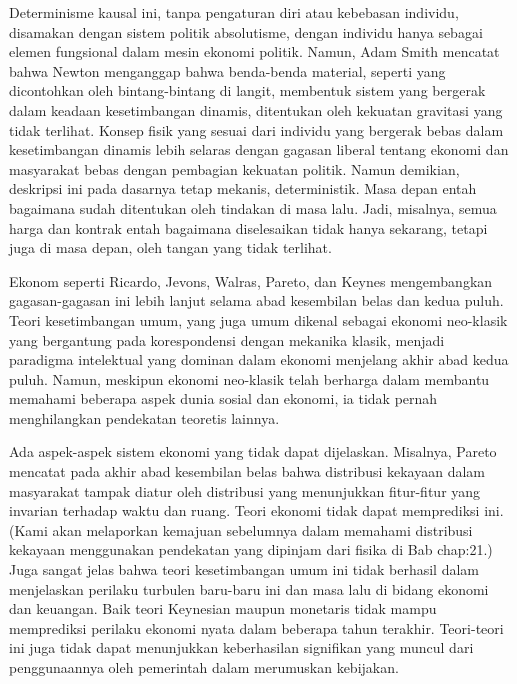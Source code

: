 \documentclass[a4paper,12pt]{book}
\begin{document}
Determinisme kausal ini, tanpa pengaturan diri atau kebebasan individu, disamakan dengan sistem politik absolutisme, dengan individu hanya sebagai elemen fungsional dalam mesin ekonomi politik. Namun, Adam Smith mencatat bahwa Newton menganggap bahwa benda-benda material, seperti yang dicontohkan oleh bintang-bintang di langit, membentuk sistem yang bergerak dalam keadaan kesetimbangan dinamis, ditentukan oleh kekuatan gravitasi yang tidak terlihat. Konsep fisik yang sesuai dari individu yang bergerak bebas dalam kesetimbangan dinamis lebih selaras dengan gagasan liberal tentang ekonomi dan masyarakat bebas dengan pembagian kekuatan politik. Namun demikian, deskripsi ini pada dasarnya tetap mekanis, deterministik. Masa depan entah bagaimana sudah ditentukan oleh tindakan di masa lalu. Jadi, misalnya, semua harga dan kontrak entah bagaimana diselesaikan tidak hanya sekarang, tetapi juga di masa depan, oleh tangan yang tidak terlihat.

Ekonom seperti Ricardo, Jevons, Walras, Pareto, dan Keynes mengembangkan gagasan-gagasan ini lebih lanjut selama abad kesembilan belas dan kedua puluh. Teori kesetimbangan umum, yang juga umum dikenal sebagai ekonomi neo-klasik yang bergantung pada korespondensi dengan mekanika klasik, menjadi paradigma intelektual yang dominan dalam ekonomi menjelang akhir abad kedua puluh. Namun, meskipun ekonomi neo-klasik telah berharga dalam membantu memahami beberapa aspek dunia sosial dan ekonomi, ia tidak pernah menghilangkan pendekatan teoretis lainnya.

Ada aspek-aspek sistem ekonomi yang tidak dapat dijelaskan. Misalnya, Pareto mencatat pada akhir abad kesembilan belas bahwa distribusi kekayaan dalam masyarakat tampak diatur oleh distribusi yang menunjukkan fitur-fitur yang invarian terhadap waktu dan ruang. Teori ekonomi tidak dapat memprediksi ini. (Kami akan melaporkan kemajuan sebelumnya dalam memahami distribusi kekayaan menggunakan pendekatan yang dipinjam dari fisika di Bab  {chap:21}.) Juga sangat jelas bahwa teori kesetimbangan umum ini tidak berhasil dalam menjelaskan perilaku turbulen baru-baru ini dan masa lalu di bidang ekonomi dan keuangan. Baik teori Keynesian maupun monetaris tidak mampu memprediksi perilaku ekonomi nyata dalam beberapa tahun terakhir. Teori-teori ini juga tidak dapat menunjukkan keberhasilan signifikan yang muncul dari penggunaannya oleh pemerintah dalam merumuskan kebijakan.
\end{document}
